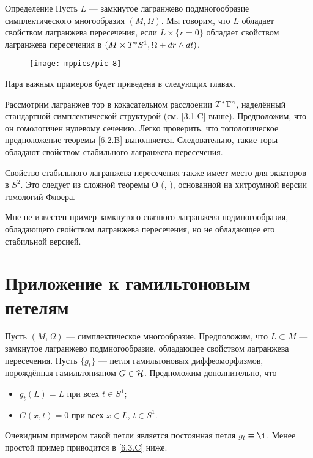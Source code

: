 \begin{thm}{Определение}\label{6.2.C}
Пусть $L$ --- замкнутое лагранжево подмногообразие симплектического многообразия $(M, \Omega)$.
Мы говорим, что $L$ обладает  свойством лагранжева пересечения, если $L \times \{r = 0\}$ обладает свойством лагранжева пересечения в $(M \times T^\ast S^1, \Omega + d r \wedge d t)$.
\end{thm}


\begin{wrapfigure}{o}{25 mm}
\vskip-3mm
\centering
\texttt{[image: mppics/pic-8]}
\caption{}\label{pic-8}
\vskip0mm
\end{wrapfigure}


Пара важных примеров будет приведена в следующих главах.

\begin{thm}{}\label{6.2.D}
Рассмотрим лагранжев тор в кокасательном расслоении $T^\ast \mathbb{T}^n$, наделённый стандартной симплектической структурой (см. \ref{3.1.C} выше).
Предположим, что он гомологичен нулевому сечению.
Легко проверить, что топологическое предположение теоремы \ref{6.2.B} выполняется.
Следовательно, такие торы обладают свойством стабильного лагранжева пересечения.
\end{thm}




\begin{thm}[Экватор на $S^2$.]{}\label{6.2.E}
Свойство стабильного лагранжева пересечения также имеет место для экваторов в $S^2$.
Это следует из сложной теоремы О (\cite{O1}, \cite{O2}), основанной на хитроумной версии гомологий Флоера.
\end{thm}


Мне не известен пример замкнутого связного лагранжева подмногообразия, обладающего свойством лагранжева пересечения, но не обладающее его стабильной версией.


\section{Приложение к гамильтоновым петелям}

Пусть $(M, \Omega)$ --- симплектическое многообразие.
Предположим, что $L \subset M$ --- замкнутое лагранжево
подмногообразие, обладающее свойством 
лагранжева пересечения.  
Пусть $\{g_t\}$ --- петля гамильтоновых диффеоморфизмов, порождённая
гамильтонианом $G \in \mathcal{H}$. 
Предположим дополнительно, что
\begin{itemize}
\item $g_t (L) = L$ при всех $t \in S^1$; 
\item $G (x, t) = 0$ при всех $x \in L$, $t \in S^1$.
\end{itemize}
Очевидным примером такой петли является постоянная петля $g_t \z\equiv \1$.
Менее простой пример приводится в \ref{6.3.C} ниже.

